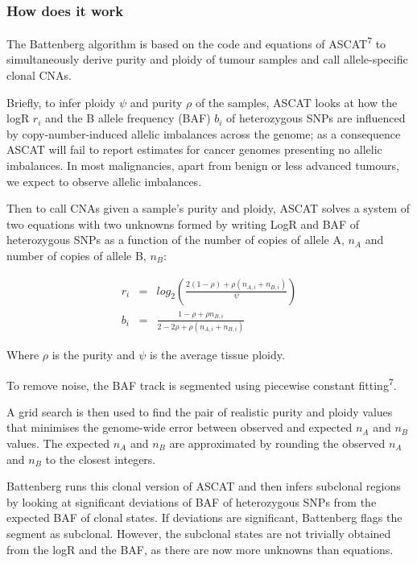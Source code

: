 \documentclass[]{article}
\begin{document}
\hypertarget{how-does-it-work}{%
\subsubsection{How does it work}\label{how-does-it-work}}

The Battenberg algorithm is based on the code and equations of
ASCAT\textsuperscript{7} to simultaneously derive purity and ploidy of
tumour samples and call allele-specific clonal CNAs.

Briefly, to infer ploidy \(\psi\) and purity \(\rho\) of the samples,
ASCAT looks at how the logR \(r_i\) and the B allele frequency (BAF)
\(b_i\) of heterozygous SNPs are influenced by copy-number-induced
allelic imbalances across the genome; as a consequence ASCAT will fail
to report estimates for cancer genomes presenting no allelic imbalances.
In most malignancies, apart from benign or less advanced tumours, we
expect to observe allelic imbalances.

Then to call CNAs given a sample's purity and ploidy, ASCAT solves a
system of two equations with two unknowns formed by writing LogR and BAF
of heterozygous SNPs as a function of the number of copies of allele A,
\(n_A\) and number of copies of allele B, \(n_B\):

\[\begin{array}{lcl} r_i&=&
  log_2(\frac{2(1-\rho)+\rho(n_{A,i}+n_{B,i})}{\psi})\\ b_i&=&\frac{1-\rho+\rho n_{B,i}}{2-2\rho+\rho(n_{A,i}+n_{B,i})}
\end{array}\]

Where \(\rho\) is the purity and \(\psi\) is the average tissue ploidy.

To remove noise, the BAF track is segmented using piecewise constant
fitting\textsuperscript{7}.

A grid search is then used to find the pair of realistic purity and
ploidy values that minimises the genome-wide error between observed and
expected \(n_A\) and \(n_B\) values. The expected \(n_A\) and \(n_B\)
are approximated by rounding the observed \(n_A\) and \(n_B\) to the
closest integers.

Battenberg runs this clonal version of ASCAT and then infers subclonal
regions by looking at significant deviations of BAF of heterozygous SNPs
from the expected BAF of clonal states. If deviations are significant,
Battenberg flags the segment as subclonal. However, the subclonal states
are not trivially obtained from the logR and the BAF, as there are now
more unknowns than equations.
\end{document}
